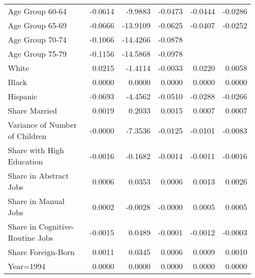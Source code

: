 \begin{table}[htbp]
\begin{tabular}{l*{5}{D{.}{.}{-0.5}}}
Age Group 60-64     &     -0.0614\sym{*}  &     -9.9883\sym{***}&     -0.0473\sym{***}&     -0.0444\sym{**} &     -0.0286         \\
Age Group 65-69     &     -0.0666\sym{**} &    -13.9109\sym{***}&     -0.0625\sym{***}&     -0.0407\sym{**} &     -0.0252         \\
Age Group 70-74     &     -0.1066\sym{***}&    -14.4266\sym{***}&     -0.0878\sym{***}&                     &                     \\
Age Group 75-79     &     -0.1156\sym{***}&    -14.5868\sym{***}&     -0.0978\sym{***}&                     &                     \\
White               &      0.0215         &     -1.4114\sym{*}  &     -0.0033         &      0.0220\sym{**} &      0.0058         \\
Black               &      0.0000         &      0.0000         &      0.0000         &      0.0000         &      0.0000         \\
Hispanic            &     -0.0693         &     -4.4562\sym{**} &     -0.0510\sym{***}&     -0.0288         &     -0.0266         \\
Share Married       &      0.0019\sym{***}&      0.2033\sym{***}&      0.0015\sym{***}&      0.0007\sym{**} &      0.0007\sym{**} \\
Variance of Number of Children&     -0.0000         &     -7.3536\sym{***}&     -0.0125         &     -0.0101         &     -0.0083         \\
Share with High Education&     -0.0016         &     -0.1682\sym{***}&     -0.0014\sym{***}&     -0.0011         &     -0.0016\sym{**} \\
Share in Abstract Jobs&      0.0006         &      0.0353         &      0.0006\sym{**} &      0.0013\sym{**} &      0.0026\sym{***}\\
Share in Manual Jobs&      0.0002         &     -0.0028         &     -0.0000         &      0.0005         &      0.0005         \\
Share in Cognitive-Routine Jobs&     -0.0015\sym{**} &      0.0489\sym{*}  &     -0.0001         &     -0.0012\sym{**} &     -0.0003         \\
Share Foreign-Born  &      0.0011         &      0.0345         &      0.0006\sym{*}  &      0.0009\sym{**} &      0.0010\sym{**} \\
Year=1994           &      0.0000         &      0.0000         &      0.0000         &      0.0000         &      0.0000         \\

\end{tabular}
\end{table}
